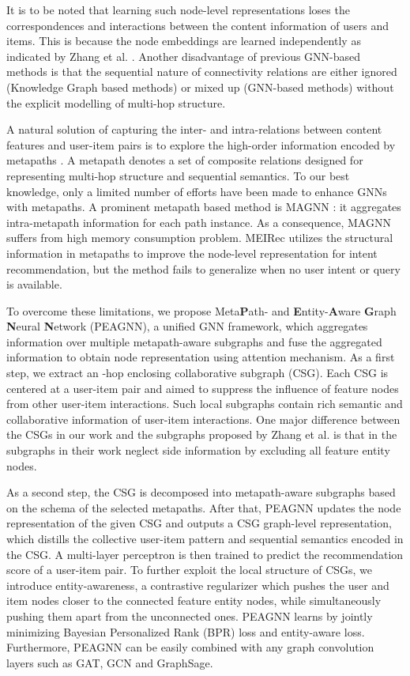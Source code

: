 \documentclass[runningheads, envcountsame, a4paper]{llncs}
\begin{document}
It is to be noted that learning 
such node-level representations loses the correspondences and interactions between the content information of users and items. 
This is because the node embeddings are learned independently as indicated by Zhang et al. \cite{zhang2019inductive}.
Another disadvantage of previous GNN-based methods is that the sequential nature of connectivity relations are either ignored (Knowledge Graph based methods) or mixed up (GNN-based methods) without the explicit modelling of multi-hop structure.  

A natural solution of capturing the inter- and intra-relations between content features and user-item pairs is to explore the high-order information encoded by metapaths \cite{dong2017metapath2vec,zhang2014meta}. 
A metapath denotes a set of composite relations designed for representing multi-hop structure and sequential semantics. 
To our best knowledge, only a limited number of efforts have been made to enhance GNNs with metapaths. 
A prominent metapath based method is MAGNN \cite{fu2020magnn}: it aggregates intra-metapath information for each path instance.
As a consequence, MAGNN suffers from high memory consumption problem.
MEIRec \cite{fan2019metapath} utilizes the structural information in metapaths to improve the node-level representation for intent recommendation, but the method fails to generalize when no user intent or query is available.

To overcome these limitations,
we propose Meta\textbf{P}ath- and \textbf{E}ntity-\textbf{A}ware \textbf{G}raph \textbf{N}eural \textbf{N}etwork (PEAGNN), a unified GNN framework, which aggregates information over multiple metapath-aware subgraphs and fuse the aggregated information to obtain node representation using attention mechanism. 
As a first step, we extract an -hop enclosing collaborative subgraph (CSG). Each CSG is centered at a user-item pair and aimed to suppress the influence of feature nodes from other user-item interactions.
Such local subgraphs contain rich 
semantic and collaborative information of user-item interactions. 
One major difference between the CSGs in our work and the subgraphs proposed by Zhang et al. 
\cite{zhang2019inductive} is that in the subgraphs in their work neglect side information by excluding all feature entity nodes.

As a second step, the CSG is decomposed into  metapath-aware subgraphs based on the schema of the selected metapaths. 
After that, PEAGNN updates the node representation of the given CSG and outputs a CSG graph-level representation, which distills the collective user-item pattern and sequential semantics encoded in the CSG.
A multi-layer perceptron is then trained to predict the recommendation score of a user-item pair.
To further exploit the local structure of CSGs, we introduce entity-awareness, a contrastive regularizer which pushes the user and item nodes closer to the connected feature entity nodes, while simultaneously pushing them apart from the unconnected ones.
PEAGNN learns by jointly minimizing Bayesian Personalized Rank (BPR) loss and entity-aware loss.
Furthermore, PEAGNN can be easily combined with any graph convolution layers such as GAT, GCN and GraphSage.
\end{document}

